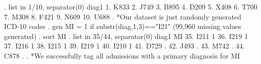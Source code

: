 . list in 1/10, separator(0)
{\smallskip}
     {\TLC}
     {\VBAR} diag1 {\VBAR}
     {\LFTT}
  1. {\VBAR}  K833 {\VBAR}
  2. {\VBAR}  J749 {\VBAR}
  3. {\VBAR}  B895 {\VBAR}
  4. {\VBAR}  D209 {\VBAR}
  5. {\VBAR}  X408 {\VBAR}
  6. {\VBAR}  T700 {\VBAR}
  7. {\VBAR}  M308 {\VBAR}
  8. {\VBAR}  F421 {\VBAR}
  9. {\VBAR}  N609 {\VBAR}
 10. {\VBAR}  U688 {\VBAR}
     {\BLC}
{\smallskip}
. *Our dataset is just randomly generated ICD-10 codes
. gen MI = 1 if substr(diag,1,3)=="I21"
(99,960 missing values generated)
{\smallskip}
. sort MI
{\smallskip}
. list in 35/44, separator(0)
{\smallskip}
     {\TLC}
     {\VBAR} diag1   MI {\VBAR}
     {\LFTT}
 35. {\VBAR}  I211    1 {\VBAR}
 36. {\VBAR}  I219    1 {\VBAR}
 37. {\VBAR}  I216    1 {\VBAR}
 38. {\VBAR}  I215    1 {\VBAR}
 39. {\VBAR}  I219    1 {\VBAR}
 40. {\VBAR}  I210    1 {\VBAR}
 41. {\VBAR}  D729    . {\VBAR}
 42. {\VBAR}  J493    . {\VBAR}
 43. {\VBAR}  M742    . {\VBAR}
 44. {\VBAR}  C878    . {\VBAR}
     {\BLC}
{\smallskip}
. *We successfully tag all admissions with a primary diagnosis for MI
